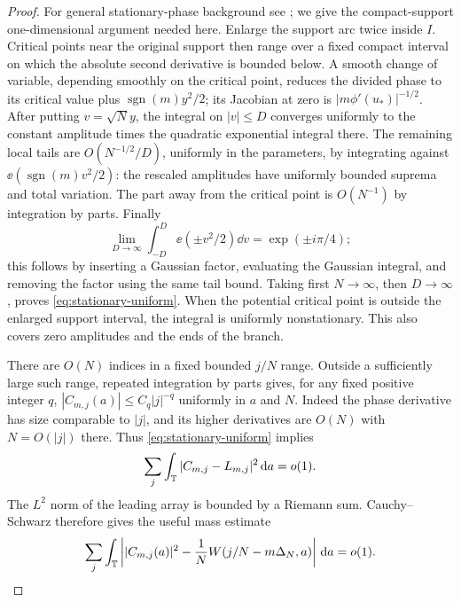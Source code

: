 \begin{proof}
For general stationary-phase background see \cite{Hormander2003};
we give the compact-support one-dimensional argument needed here.
Enlarge the support arc twice inside $I$. Critical points
near the original support then range over a fixed compact interval on
which the absolute second derivative is bounded below. A smooth change
of variable, depending smoothly on the critical point, reduces the
divided phase to its critical value plus
$\operatorname{sgn}(m)y^2/2$; its Jacobian at zero is
$|m\phi'(u_*)|^{-1/2}$. After putting $v=\sqrt N y$, the integral on
$|v|\le D$ converges uniformly to the constant amplitude times the
quadratic exponential integral there. The remaining local tails are
$O(N^{-1/2}/D)$, uniformly in the parameters, by integrating against
$\ee(\operatorname{sgn}(m)v^2/2)$: the rescaled amplitudes have uniformly
bounded suprema and total variation. The part away from the critical
point is $O(N^{-1})$ by integration by parts. Finally
\[
 \lim_{D\to\infty}\int_{-D}^D\ee(\pm v^2/2)\dd v
          =\exp(\pm i\pi/4);
\]
this follows by inserting a Gaussian factor, evaluating the Gaussian
integral, and removing the factor using the same tail bound.
Taking first $N\to\infty$, then $D\to\infty$, proves
\eqref{eq:stationary-uniform}. When the potential critical point is
outside the enlarged support interval, the integral is uniformly
nonstationary. This also covers zero amplitudes and the ends of the
branch.

There are $O(N)$ indices in a fixed bounded $j/N$ range. Outside a
sufficiently large such range, repeated integration by parts gives,
for any fixed positive integer $q$,
$|C_{m,j}(a)|\le C_q|j|^{-q}$ uniformly in $a$ and $N$.
Indeed the phase derivative has size comparable to $|j|$, and its
higher derivatives are $O(N)$ with $N=O(|j|)$ there. Thus
\eqref{eq:stationary-uniform} implies
\[
 \sum_j\int_\mathbb T |C_{m,j}-L_{m,j}|^2\,\mathrm d a=o(1).
\]
The $L^2$ norm of the leading array is bounded by a Riemann sum.
Cauchy--Schwarz therefore gives the useful mass estimate
\begin{equation}\label{eq:summed-stationary-mass}
 \sum_j\int_\mathbb T
 \left||C_{m,j}(a)|^2
       -\frac1N W(j/N-m\Delta_N,a)\right|\,\mathrm d a=o(1).
\end{equation}


\end{proof}
